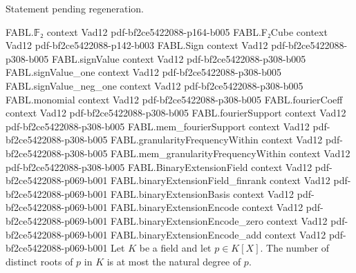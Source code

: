 \begin{theorem}
\label{FABL.binaryExtensionEncode_add}
\leanok
{}
Statement pending regeneration.
\end{theorem}

\begin{theorem}
\proofstep
  {FABL.𝔽₂}
  {context}
  {Vad12}
  {pdf-bf2ce5422088-p164-b005}
\proofstep
  {FABL.F₂Cube}
  {context}
  {Vad12}
  {pdf-bf2ce5422088-p142-b003}
\proofstep
  {FABL.Sign}
  {context}
  {Vad12}
  {pdf-bf2ce5422088-p308-b005}
\proofstep
  {FABL.signValue}
  {context}
  {Vad12}
  {pdf-bf2ce5422088-p308-b005}
\proofstep
  {FABL.signValue_one}
  {context}
  {Vad12}
  {pdf-bf2ce5422088-p308-b005}
\proofstep
  {FABL.signValue_neg_one}
  {context}
  {Vad12}
  {pdf-bf2ce5422088-p308-b005}
\proofstep
  {FABL.monomial}
  {context}
  {Vad12}
  {pdf-bf2ce5422088-p308-b005}
\proofstep
  {FABL.fourierCoeff}
  {context}
  {Vad12}
  {pdf-bf2ce5422088-p308-b005}
\proofstep
  {FABL.fourierSupport}
  {context}
  {Vad12}
  {pdf-bf2ce5422088-p308-b005}
\proofstep
  {FABL.mem_fourierSupport}
  {context}
  {Vad12}
  {pdf-bf2ce5422088-p308-b005}
\proofstep
  {FABL.granularityFrequencyWithin}
  {context}
  {Vad12}
  {pdf-bf2ce5422088-p308-b005}
\proofstep
  {FABL.mem_granularityFrequencyWithin}
  {context}
  {Vad12}
  {pdf-bf2ce5422088-p308-b005}
\proofstep
  {FABL.BinaryExtensionField}
  {context}
  {Vad12}
  {pdf-bf2ce5422088-p069-b001}
\proofstep
  {FABL.binaryExtensionField_finrank}
  {context}
  {Vad12}
  {pdf-bf2ce5422088-p069-b001}
\proofstep
  {FABL.binaryExtensionBasis}
  {context}
  {Vad12}
  {pdf-bf2ce5422088-p069-b001}
\proofstep
  {FABL.binaryExtensionEncode}
  {context}
  {Vad12}
  {pdf-bf2ce5422088-p069-b001}
\proofstep
  {FABL.binaryExtensionEncode_zero}
  {context}
  {Vad12}
  {pdf-bf2ce5422088-p069-b001}
\proofstep
  {FABL.binaryExtensionEncode_add}
  {context}
  {Vad12}
  {pdf-bf2ce5422088-p069-b001}
\label{FABL.ncard_rootSet_le_natDegree}
\leanok
{}
Let $K$ be a field and let $p\in K[X]$. The number of distinct roots of $p$ in $K$ is at
most the natural degree of $p$.
\end{theorem}

